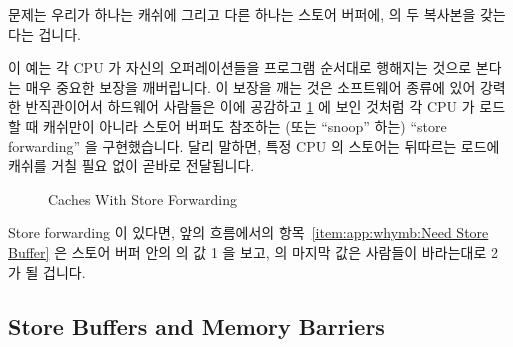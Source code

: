 문제는 우리가 하나는 캐쉬에 그리고 다른 하나는 스토어 버퍼에,  의 두
복사본을 갖는다는 겁니다.

이 예는 각 CPU 가 자신의 오퍼레이션들을 프로그램 순서대로 행해지는 것으로
본다는 매우 중요한 보장을 깨버립니다.
이 보장을 깨는 것은 소프트웨어 종류에 있어 강력한 반직관이어서 하드웨어
사람들은 이에 공감하고
\cref{fig:app:whymb:Caches With Store Forwarding} 에 보인 것처럼
각 CPU 가 로드할 때 캐쉬만이 아니라 스토어 버퍼도 참조하는 (또는 ``snoop''
하는) ``store forwarding'' 을 구현했습니다.
달리 말하면, 특정 CPU 의 스토어는 뒤따르는 로드에 캐쉬를 거칠 필요 없이 곧바로
전달됩니다.

\iffalse

The problem is that we have two copies of \qco{a}, one in the cache and
the other in the store buffer.

This example breaks a very important guarantee, namely that each CPU
will always see its own operations as if they happened in program order.
Breaking this guarantee is violently counter-intuitive to software types,
so much so
that the hardware guys took pity and implemented ``store forwarding'',
where each CPU refers to (or ``snoops'') its store buffer as well
as its cache when performing loads, as shown in
\cref{fig:app:whymb:Caches With Store Forwarding}.
In other words, a given CPU's stores are directly forwarded to its
subsequent loads, without having to pass through the cache.

\fi

\begin{figure}[htb]
\centering
{}
\caption{Caches With Store Forwarding}
\label{fig:app:whymb:Caches With Store Forwarding}
\end{figure}

Store forwarding 이 있다면, 앞의 흐름에서의
항목~\ref{item:app:whymb:Need Store Buffer} 은 스토어 버퍼 안의  의 값 1
을 보고,  의 마지막 값은 사람들이 바라는대로 2 가 될 겁니다.

\iffalse

With store forwarding in place, item~\ref{item:app:whymb:Need Store Buffer}
in the above sequence would have found the correct value of 1 for \qco{a} in
the store buffer, so that the final value of \qco{b} would have been 2,
as one would hope.

\fi

\subsection{Store Buffers and Memory Barriers}
\label{sec:app:whymb:Store Buffers and Memory Barriers}

